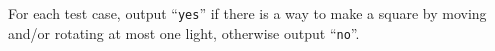 
    For each test case, output ``\texttt{yes}'' if there is a way to make a square by moving and/or rotating at most one light, otherwise output ``\texttt{no}''.
